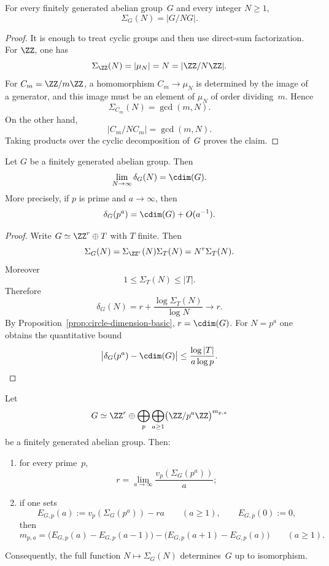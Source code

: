 \begin{proposition}%
\label{prop:cdim-phase-spectrum-quotient}
For every finitely generated abelian group~$G$ and every integer
$N\ge 1$,
\[
\Sigma_G(N)=|G/NG|.
\]
\end{proposition}

\begin{proof}
It is enough to treat cyclic groups and then use direct-sum
factorization.  For $\ZZ$, one has
\[
\Sigma_{\ZZ}(N)=|\mu_N|=N=|\ZZ/N\ZZ|.
\]
For $C_m=\ZZ/m\ZZ$, a homomorphism $C_m\to\mu_N$ is determined by the
image of a generator, and this image must be an element of $\mu_N$ of
order dividing~$m$.  Hence
\[
\Sigma_{C_m}(N)=\gcd(m,N).
\]
On the other hand,
\[
|C_m/NC_m|=\gcd(m,N).
\]
Taking products over the cyclic decomposition of~$G$ proves the claim.
\end{proof}

\begin{theorem}%
\label{thm:cdim-phase-spectrum-limit}
Let $G$ be a finitely generated abelian group.  Then
\[
\lim_{N\to\infty}\delta_G(N)=\cdim(G).
\]
More precisely, if $p$ is prime and $a\to\infty$, then
\[
\delta_G(p^a)=\cdim(G)+O(a^{-1}).
\]
\end{theorem}

\begin{proof}
Write $G\simeq \ZZ^r\oplus T$ with $T$ finite.  Then
\[
\Sigma_G(N)=\Sigma_{\ZZ^r}(N)\Sigma_T(N)=N^r\Sigma_T(N).
\]
Moreover
\[
1\le \Sigma_T(N)\le |T|.
\]
Therefore
\[
\delta_G(N)=r+\frac{\log\Sigma_T(N)}{\log N}\longrightarrow r.
\]
By Proposition~\ref{prop:circle-dimension-basic}, $r=\cdim(G)$.
For $N=p^a$ one obtains the quantitative bound
\[
\bigl|\delta_G(p^a)-\cdim(G)\bigr|
\le \frac{\log |T|}{a\log p}.
\]
\end{proof}

\begin{theorem}%
\label{thm:cdim-phase-spectrum-reconstruction}
Let
\[
G\simeq \ZZ^r\oplus\bigoplus_{p}\bigoplus_{a\ge 1}
\bigl(\ZZ/p^a\ZZ\bigr)^{m_{p,a}}
\]
be a finitely generated abelian group.  Then:
\begin{enumerate}[label=(\roman*)]
\item for every prime~$p$,
      \[
      r=\lim_{a\to\infty}\frac{v_p(\Sigma_G(p^a))}{a};
      \]
\item if one sets
      \[
      E_{G,p}(a):=v_p(\Sigma_G(p^a))-ra
      \qquad(a\ge 1),\qquad E_{G,p}(0):=0,
      \]
      then
      \[
      m_{p,a}
      =\bigl(E_{G,p}(a)-E_{G,p}(a-1)\bigr)
      -\bigl(E_{G,p}(a+1)-E_{G,p}(a)\bigr)
      \qquad(a\ge 1).
      \]
\end{enumerate}
Consequently, the full function $N\mapsto \Sigma_G(N)$ determines~$G$
up to isomorphism.
\end{theorem}

